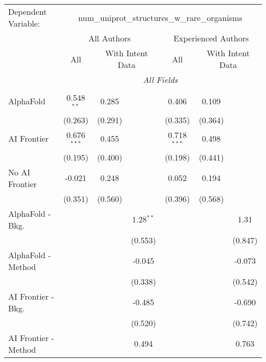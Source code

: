 \begingroup
\centering
\begin{tabular}{lcccccc}
   \tabularnewline \midrule \midrule
   Dependent Variable: & \multicolumn{6}{c}{num\_uniprot\_structures\_w\_rare\_organisms}\\
 & \multicolumn{3}{c}{All Authors} & \multicolumn{3}{c}{Experienced Authors} \\
\cmidrule(lr){2-4} \cmidrule(lr){5-7}
 & \multicolumn{1}{c}{All} & \multicolumn{2}{c}{With Intent Data} & \multicolumn{1}{c}{All} & \multicolumn{2}{c}{With Intent Data} \\
\cmidrule(lr){2-2} \cmidrule(lr){3-4} \cmidrule(lr){5-5} \cmidrule(lr){6-7}
 & \multicolumn{6}{c}{\textit{All Fields}} \\ \\
   AlphaFold               & 0.548$^{**}$  & 0.285   &             & 0.406         & 0.109   &   \\   
                           & (0.263)       & (0.291) &             & (0.335)       & (0.364) &   \\   
   AI Frontier             & 0.676$^{***}$ & 0.455   &             & 0.718$^{***}$ & 0.498   &   \\   
                           & (0.195)       & (0.400) &             & (0.198)       & (0.441) &   \\   
   No AI Frontier          & -0.021        & 0.248   &             & 0.052         & 0.194   &   \\   
                           & (0.351)       & (0.560) &             & (0.396)       & (0.568) &   \\   
   AlphaFold - Bkg.        &               &         & 1.28$^{**}$ &               &         & 1.31\\   
                           &               &         & (0.553)     &               &         & (0.847)\\   
   AlphaFold - Method      &               &         & -0.045      &               &         & -0.073\\   
                           &               &         & (0.338)     &               &         & (0.542)\\   
   AI Frontier - Bkg.      &               &         & -0.485      &               &         & -0.690\\   
                           &               &         & (0.520)     &               &         & (0.742)\\   
   AI Frontier - Method    &               &         & 0.494       &               &         & 0.763\\   

\end{tabular}
